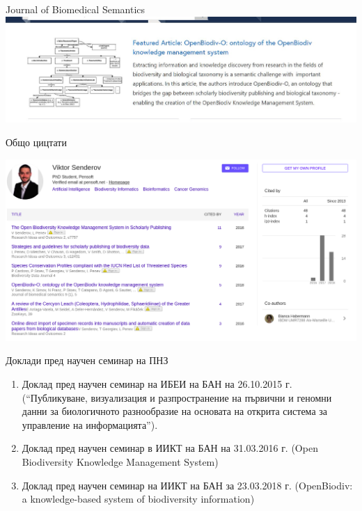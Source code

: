 \documentclass[bulgarian]{beamer}
\begin{document}
\begin{frame}{Journal of Biomedical Semantics}
\centering
\includegraphics[width=\textwidth]{Figures/JBS-featured.jpg}
\decoRule
\caption{Статията за OpenBiodiv-O е на началната страница JBS}
\label{fig:jbs-featured}
\end{frame}


\begin{frame}{Общо цицтати}

\centering
\includegraphics[width=\textwidth]{Figures/Google-scholar.png}

\end{frame}



\begin{frame}{Доклади пред научен семинар на ПНЗ}

\begin{enumerate}
    \item Доклад пред научен семинар на ИБЕИ на БАН на 26.10.2015 г. (``Публикуване, визуализация и разпространение на първични и геномни данни за биологичното разнообразие на основата на открита система за управление на информацията'').
    \item Доклад пред научен семинар в ИИКТ на БАН на 31.03.2016 г. (Open Biodiversity Knowledge Management System)
    \item Доклад пред научен семинар на ИИКТ на БАН за 23.03.2018 г. (OpenBiodiv: a knowledge-based system of biodiversity information)
\end{enumerate}

\end{frame}
\end{document}
